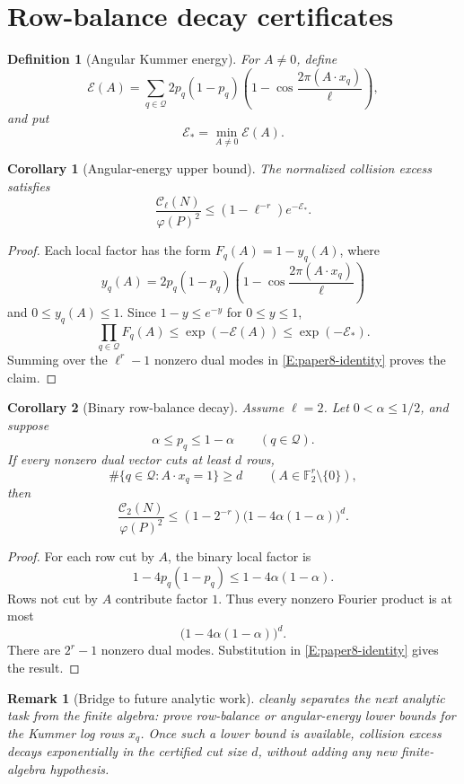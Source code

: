 \documentclass[11pt]{article}
\newtheorem{corollary}{Corollary}
\newtheorem{definition}{Definition}
\newtheorem{remark}{Remark}
\newcommand{\F}{\mathbb F}
\begin{document}
\section{Row-balance decay certificates}

\begin{definition}[Angular Kummer energy]
For \(A\ne0\), define
\[
\mathcal E(A)=
\sum_{q\in\mathcal Q}
2p_q(1-p_q)
\left(1-\cos\frac{2\pi(A\cdot x_q)}{\ell}\right),
\]
and put
\[
\mathcal E_*=\min_{A\ne0}\mathcal E(A).
\]
\end{definition}

\begin{corollary}[Angular-energy upper bound]\label{C:angular-energy}
The normalized collision excess satisfies
\[
\frac{\mathcal C_\ell(N)}{\varphi(P)^2}
\le
(1-\ell^{-r})e^{-\mathcal E_*}.
\]
\end{corollary}

\begin{proof}
Each local factor has the form \(F_q(A)=1-y_q(A)\), where
\[
y_q(A)=2p_q(1-p_q)
\left(1-\cos\frac{2\pi(A\cdot x_q)}{\ell}\right)
\]
and \(0\le y_q(A)\le1\).  Since \(1-y\le e^{-y}\) for \(0\le y\le1\),
\[
\prod_{q\in\mathcal Q}F_q(A)
\le
\exp(-\mathcal E(A))
\le
\exp(-\mathcal E_*).
\]
Summing over the \(\ell^r-1\) nonzero dual modes in \eqref{E:paper8-identity} proves the claim.
\end{proof}

\begin{corollary}[Binary row-balance decay]\label{C:binary-row-balance}
Assume \(\ell=2\).  Let \(0<\alpha\le1/2\), and suppose
\[
\alpha\le p_q\le1-\alpha
\qquad(q\in\mathcal Q).
\]
If every nonzero dual vector cuts at least \(d\) rows,
\[
\#\{q\in\mathcal Q:A\cdot x_q=1\}\ge d
\qquad(A\in\F_2^r\setminus\{0\}),
\]
then
\[
\frac{\mathcal C_2(N)}{\varphi(P)^2}
\le
(1-2^{-r})\bigl(1-4\alpha(1-\alpha)\bigr)^d.
\]
\end{corollary}

\begin{proof}
For each row cut by \(A\), the binary local factor is
\[
1-4p_q(1-p_q)\le1-4\alpha(1-\alpha).
\]
Rows not cut by \(A\) contribute factor \(1\).  Thus every nonzero Fourier product is at most
\[
\bigl(1-4\alpha(1-\alpha)\bigr)^d.
\]
There are \(2^r-1\) nonzero dual modes.  Substitution in \eqref{E:paper8-identity} gives the result.
\end{proof}

\begin{remark}[Bridge to future analytic work]
 cleanly separates the next analytic task from the finite algebra: prove row-balance or angular-energy lower bounds for the Kummer log rows \(x_q\).  Once such a lower bound is available, collision excess decays exponentially in the certified cut size \(d\), without adding any new finite-algebra hypothesis.
\end{remark}
\end{document}
